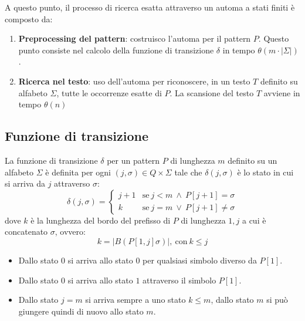 A questo punto, il processo di ricerca esatta attraverso un automa a stati finiti
è composto da:
\begin{enumerate}
    \item \textbf{Preprocessing del pattern}: costruisco l'automa per il pattern
          $P$. Questo punto consiste nel calcolo della funzione di transizione
          $\delta$ in tempo $\theta(m \cdot |\Sigma|)$.
    \item \textbf{Ricerca nel testo}: uso dell'automa per riconoscere, in un testo
          $T$ definito su alfabeto $\Sigma$, tutte le occorrenze esatte di $P$.
          La scansione del testo $T$ avviene in tempo $\theta(n)$
\end{enumerate}
\subsection{Funzione di transizione}
La funzione di transizione $\delta$ per un pattern $P$ di lunghezza $m$ definito
su un alfabeto $\Sigma$ è definita per ogni $(j, \sigma) \in Q \times \Sigma$ tale
che $\delta(j, \sigma)$ è lo stato in cui si arriva da $j$ attraverso $\sigma$:
\begin{equation}
    \delta(j, \sigma) = \begin{cases}
        j + 1 & \text{se} \ j < m \ \land \ P[j + 1] = \sigma   \\
        k     & \text{se} \ j = m \ \lor \ P[j + 1] \neq \sigma
    \end{cases}
\end{equation}
dove $k$ è la lunghezza del bordo del prefisso di $P$ di lunghezza $1, j$ a cui
è concatenato $\sigma$, ovvero:
\begin{equation}
    k = |B(P[1, j]\sigma)|, \ \text{con} \ k \leq j
\end{equation}
\begin{itemize}
    \item Dallo stato $0$ si arriva allo stato $0$ per qualsiasi simbolo diverso
          da $P[1]$.
    \item Dallo stato $0$ si arriva allo stato $1$ attraverso il simbolo $P[1]$.
    \item  Dallo stato $j = m$ si arriva sempre a uno stato $k \leq m$, dallo
          stato $m$ si può giungere quindi di nuovo allo stato $m$.
\end{itemize}

